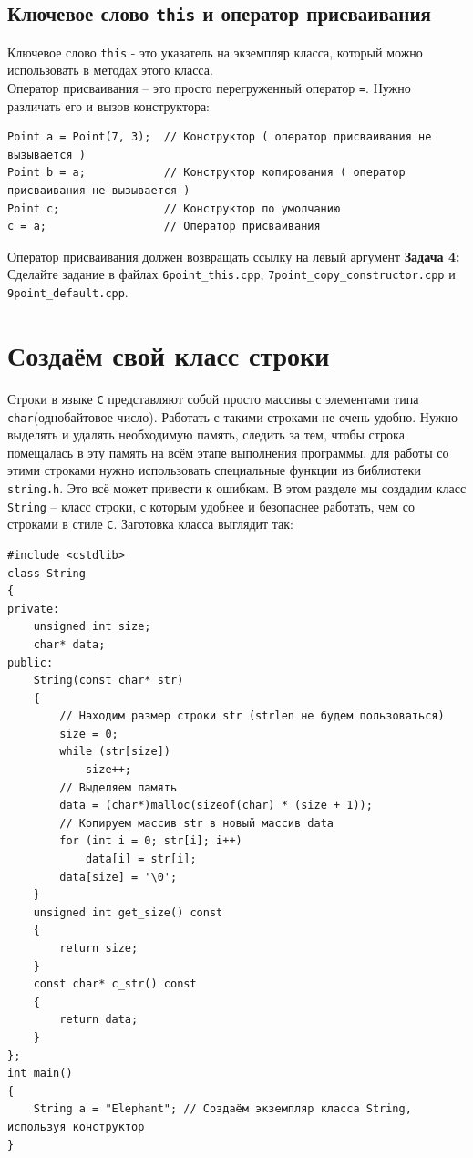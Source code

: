 \documentclass{article}
\begin{document}
\subsection*{Ключевое слово \texttt{this} и оператор присваивания}
Ключевое слово \texttt{this} - это указатель на экземпляр класса, который можно использовать в методах этого класса.\\
Оператор присваивания -- это просто перегруженный оператор \texttt{=}. Нужно различать его и вызов конструктора:
\begin{lstlisting}
Point a = Point(7, 3);  // Конструктор ( оператор присваивания не вызывается )
Point b = a;            // Конструктор копирования ( оператор присваивания не вызывается )
Point c;                // Конструктор по умолчанию
c = a;                  // Оператор присваивания
\end{lstlisting}
Оператор присваивания должен возвращать ссылку на левый аргумент
\textbf{Задача 4:} Сделайте задание в файлах \texttt{6point\_this.cpp}, \texttt{7point\_copy\_constructor.cpp} и \texttt{9point\_default.cpp}.

\newpage
\section*{Создаём свой класс строки}
Строки в языке \texttt{C} представляют собой просто массивы с элементами типа \texttt{char}(однобайтовое число). Работать с такими строками не очень удобно. Нужно выделять и удалять необходимую память, следить за тем, чтобы строка помещалась в эту память на всём этапе выполнения программы, для работы со этими строками нужно использовать специальные функции из библиотеки \texttt{string.h}. Это всё может привести к ошибкам. В этом разделе мы создадим класс \texttt{String} -- класс строки, с которым удобнее и безопаснее работать, чем со строками в стиле \texttt{C}. Заготовка класса выглядит так:
\begin{lstlisting}
#include <cstdlib>
class String
{
private:
	unsigned int size;
	char* data;
public:
	String(const char* str)
	{
		// Находим размер строки str (strlen не будем пользоваться)
		size = 0;
		while (str[size])
			size++;
		// Выделяем память
		data = (char*)malloc(sizeof(char) * (size + 1));
		// Копируем массив str в новый массив data
		for (int i = 0; str[i]; i++)
			data[i] = str[i];
		data[size] = '\0';
	}
	unsigned int get_size() const
	{
		return size;
	}
	const char* c_str() const
	{
		return data;
	}
};
int main()
{
	String a = "Elephant"; // Создаём экземпляр класса String, используя конструктор
}
\end{lstlisting}
\end{document}
